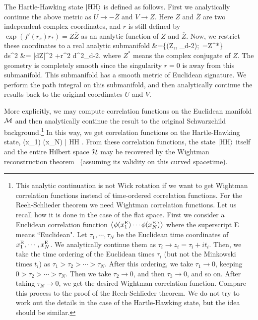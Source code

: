 \documentclass[12pt,a4paper]{article}
\theoremstyle{plain}
\theoremstyle{definition}
\numberwithin{thm}{section}
\newcommand{\vev}[1]{ \left\langle {#1} \right\rangle }
\newcommand{\bra}[1]{ \langle {#1} | }
\newcommand{\ket}[1]{ | {#1} \rangle }
\def\CH{{\cal H}}
\def\CM{{\cal M}}
\def\beq#1\eeq{\begin{align}#1\end{align}}
\begin{document}
The Hartle-Hawking state $\ket{{\rm HH}}$ is defined as follows. First we analytically continue the above metric 
as $U \to - \overline{Z}$ and $V \to Z$. Here $Z$ and $\overline{Z}$ are two independent complex coordinates, and $r$ is still defined by 
$\exp(f'(r_s)r_*)=Z\overline{Z}$ as an analytic function of $Z$ and $\overline{Z}$. Now, we restrict these coordinates to a real analytic submanifold 
\beq
\CM &=\{(Z,, \Omega_{d-2});~=Z^*\} \\
ds^2 &=  |dZ|^2 +r^2 d\Omega^2_{d-2}.
\eeq
where $Z^*$ means the complex conjugate of $Z$.
The geometry is completely smooth since the singularity $r=0$ is away from this submanifold. This submanifold has a smooth metric of Euclidean signature.
We perform the path integral on this submanifold, and then analytically continue the results back to the original coordinates $U$ and $V$.

More explicitly, we may compute correlation functions on the Euclidean manifold $\CM$ and then analytically continue the result to the original Schwarzchild background.\footnote{
This analytic continuation is not Wick rotation if we want to get Wightman correlation functions instead of time-ordered correlation functions.
For the Reeh-Schlieder theorem we need Wightman correlation functions. Let us recall how it is done in the case of the flat space.
First we consider a Euclidean correlation function $\vev{\phi(x_1^{\rm E} ) \cdots \phi(x^{\rm E}_N)}$ where the superscript E means ``Euclidean".
Let $\tau_1, \cdots, \tau_N$ be the Euclidean time coordinates of $x^{\rm E}_1, \cdots, x^{\rm E}_N$. We analytically continue them
as $\tau_i \to z_i = \tau_i+i t_i $. Then, we take the time ordering of the Euclidean times $\tau_i$ (but not the Minkowski times $t_i$) as
$\tau_1>\tau_2 > \cdots > \tau_N$. After this ordering, we take $\tau_1 \to 0$, keeping $0>\tau_2> \cdots >\tau_N$. Then we take $\tau_2 \to 0$, and then $\tau_3 \to 0$, and so on.
After taking $\tau_N \to 0$, we get the desired Wightman correlation function. Compare this process to the proof of the Reeh-Schlieder theorem.
We do not try to work out the details in the case of the Hartle-Hawking state, but the idea should be similar.}
In this way, we get correlation functions on the Hartle-Hawking state, 
\beq
\bra{{\rm HH}} \phi(x_1) \cdots \phi(x_N) \ket{{\rm HH}}.
\eeq
From these correlation functions, the state $\ket{{\rm HH}}$ itself and the entire Hilbert space $\CH$ may be recovered
by the Wightman reconstruction theorem~\cite{Streater:1989vi} (assuming its validity on this curved spacetime).
\end{document}
